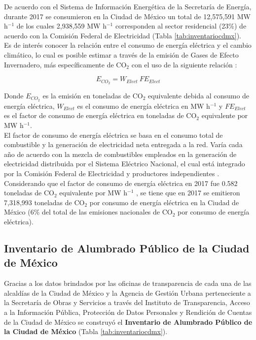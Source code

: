 De acuerdo con el Sistema de Información Energética de la Secretaría de Energía, durante 2017 se consumieron en la Ciudad de México un total de 12,575,591 MW h$^{-1}$ de los cuales 2,938,559 MW h$^{-1}$ corresponden al sector residencial (23\%) de acuerdo con la Comisión Federal de Electricidad (Tabla \ref{tab:inventariocdmx}).\\

Es de interés conocer la relación entre el consumo de energía eléctrica y el cambio climático, lo cual es posible estimar a través de la emisión de Gases de Efecto Invernadero, más específicamente de CO$_{2}$ con el uso de la siguiente relación \citep{UTSEDEMA2018}: 

\begin{equation}
E_{CO_{2}} = W_{Elect}\: FE_{Elect}
\end{equation}

Donde $E_{CO_{2}}$ es la emisión en toneladas de CO$_{2}$ equivalente debida al consumo de energía eléctrica, $W_{Elect}$ es el consumo de energía eléctrica en MW h$^{-1}$ y $FE_{Elect}$ es el factor de consumo de energía eléctrica en toneladas de CO$_{2}$ equivalente por MW h$^{-1}$.\\

El factor de consumo de energía eléctrica se basa en el consumo total de combustible y la generación de electricidad neta entregada a la red. Varía cada año de acuerdo con la mezcla de combustibles empleados en la generación de electricidad distribuida por el Sistema Eléctrico Nacional, el cual está integrado por la Comisión Federal de Electricidad y productores independientes \citep{GEI2013}.\\

Considerando que el factor de consumo de energía eléctrica en 2017 fue 0.582 toneladas de CO$_{2}$ equivalente por MW h$^{-1}$ \citep{CRE2017}, se tiene que en 2017 se emitieron 7,318,993 toneladas de CO$_{2}$ por consumo de energía eléctrica en la Ciudad de México (6\% del total de las emisiones nacionales de CO$_{2}$ por consumo de energía eléctrica).\\

\subsection{Inventario de Alumbrado Público de la Ciudad de México}

Gracias a los datos brindados por las oficinas de transparencia de cada una de las alcaldías de la Ciudad de México y la Agencia de Gestión Urbana perteneciente a la Secretaría de Obras y Servicios a través del Instituto de Transparencia, Acceso a la Información Pública, Protección de Datos Personales y Rendición de Cuentas de la Ciudad de México se construyó el \textbf{Inventario de Alumbrado Público de la Ciudad de México} (Tabla \ref{tab:inventariocdmx}).\\

